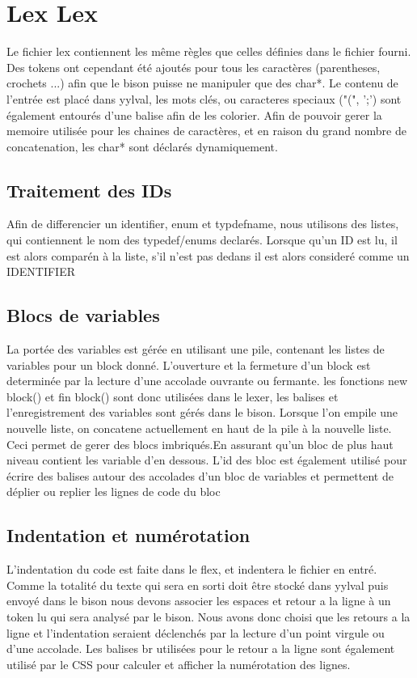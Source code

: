 \documentclass{report}
\begin{document}
\section{Lex Lex}{
		Le fichier lex contiennent les même règles que celles définies dans le fichier fourni. Des tokens ont cependant été ajoutés pour tous les caractères (parentheses, crochets ...) afin 
		que le bison puisse ne manipuler que des char*. Le contenu de l'entrée est placé dans yylval, les mots clés, ou caracteres speciaux ("(", ';') sont également entourés d'une balise
		afin de les colorier. Afin de pouvoir gerer la memoire utilisée pour les chaines de caractères, et en raison du grand nombre de concatenation, les char* sont déclarés dynamiquement.
		\subsection{Traitement des IDs}{
	Afin de differencier un identifier, enum et typdefname, nous utilisons des listes, qui contiennent le nom des typedef/enums declarés. Lorsque qu'un ID est lu, il est alors comparén à
			 la liste, s'il n'est pas dedans il est alors consideré comme un IDENTIFIER
}
		\subsection{Blocs de variables}{
		La portée des variables est gérée en utilisant une pile, contenant les listes de variables pour un block donné. L'ouverture et la fermeture d'un block est determinée par la lecture d'une accolade ouvrante ou fermante. les fonctions new block() et fin block() sont donc utilisées dans le lexer, les balises et l'enregistrement des variables sont gérés dans le bison. Lorsque l'on empile une nouvelle liste, on concatene actuellement en haut de la pile à la nouvelle liste. Ceci permet de gerer des blocs imbriqués.En assurant qu'un bloc de plus haut niveau contient les variable d'en dessous.
L'id des bloc est également utilisé pour écrire des balises autour des accolades d'un bloc de variables et permettent de déplier ou replier les lignes de code du bloc
}
		\subsection{Indentation et numérotation}{
			L'indentation du code est faite dans le flex, et indentera le fichier en entré. Comme la totalité du texte qui sera en sorti doit être stocké dans yylval puis envoyé dans le bison
			nous devons associer les espaces et retour a la ligne à un token lu qui sera analysé par le bison. Nous avons donc choisi que les retours a la ligne et l'indentation seraient 
			déclenchés par la lecture d'un point virgule ou d'une accolade. Les balises br utilisées pour le retour a la ligne sont également utilisé par le CSS pour calculer et afficher la numérotation des lignes.
}
}
\end{document}
